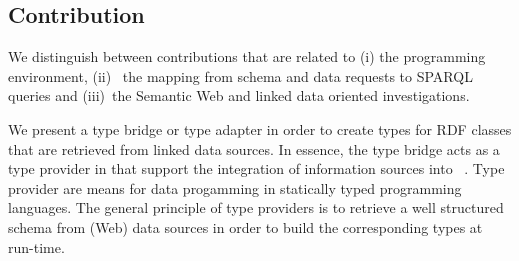 \documentclass{llncs} %
\begin{document}





\subsection{Contribution}

We distinguish between contributions 
that are related to (i) the programming environment, (ii)~ the mapping from
schema and data requests to SPARQL queries and (iii)~the Semantic Web and linked data
oriented investigations.


We present a type bridge or type adapter in order to create types for RDF classes that
are retrieved from linked data sources. 
In essence, the type bridge acts as a type provider in \fsharp that support the integration of information sources
into \fsharp~\cite{Syme2012fsharp}. Type provider are means for data progamming
in statically typed programming languages.
The general principle of type providers is 
to retrieve a well structured schema from (Web) data sources in order to build
the corresponding types at run-time.
\end{document}
